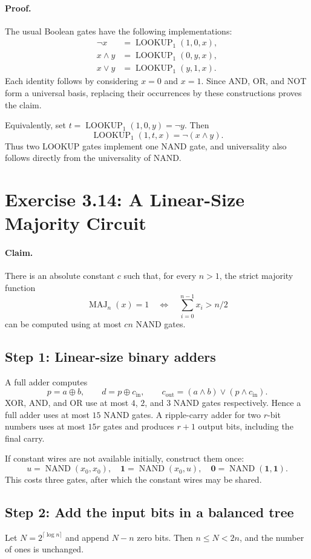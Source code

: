 \documentclass[UTF8,fontset=fandol,11pt,a4paper]{ctexart}
\newcommand{\NAND}{\operatorname{NAND}}
\newcommand{\MAJ}{\operatorname{MAJ}}
\newcommand{\LOOKUP}{\operatorname{LOOKUP}}
\begin{document}
\paragraph{Proof.}
The usual Boolean gates have the following implementations:
\begin{align*}
 \neg x&=\LOOKUP_1(1,0,x),\\
 x\land y&=\LOOKUP_1(0,y,x),\\
 x\lor y&=\LOOKUP_1(y,1,x).
\end{align*}
Each identity follows by considering $x=0$ and $x=1$.
Since AND, OR, and NOT form a universal basis, replacing their
occurrences by these constructions proves the claim.

Equivalently, set $t=\LOOKUP_1(1,0,y)=\neg y$. Then
\[
 \LOOKUP_1(1,t,x)=\neg(x\land y).
\]
Thus two LOOKUP gates implement one NAND gate, and universality
also follows directly from the universality of NAND.

\section{Exercise 3.14: A Linear-Size Majority Circuit}

\paragraph{Claim.}
There is an absolute constant $c$ such that, for every $n>1$,
the strict majority function
\[
 \MAJ_n(x)=1\quad\Longleftrightarrow\quad
 \sum_{i=0}^{n-1}x_i>n/2
\]
can be computed using at most $cn$ NAND gates.

\subsection*{Step 1: Linear-size binary adders}
A full adder computes
\[
 p=a\oplus b,\qquad d=p\oplus c_{\mathrm{in}},\qquad
 c_{\mathrm{out}}=(a\land b)\lor(p\land c_{\mathrm{in}}).
\]
XOR, AND, and OR use at most $4$, $2$, and $3$ NAND gates respectively.
Hence a full adder uses at most $15$ NAND gates. A ripple-carry adder
for two $r$-bit numbers uses at most $15r$ gates and produces $r+1$
output bits, including the final carry.

If constant wires are not available initially, construct them once:
\[
 u=\NAND(x_0,x_0),\quad
 \mathbf 1=\NAND(x_0,u),\quad
 \mathbf 0=\NAND(\mathbf 1,\mathbf 1).
\]
This costs three gates, after which the constant wires may be shared.

\subsection*{Step 2: Add the input bits in a balanced tree}
Let $N=2^{\lceil\log n\rceil}$ and append $N-n$ zero bits.
Then $n\le N<2n$, and the number of ones is unchanged.
\end{document}
